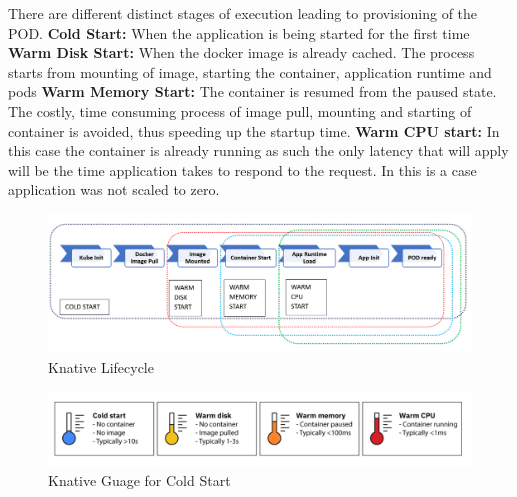 \documentclass{article}
\begin{document}
\begin{flushleft}
There are different distinct stages of execution leading to provisioning of the POD. 
\newline
\textbf{Cold Start:} When the application is being started for the first time
\newline
\textbf{Warm Disk Start:} When the docker image is already cached. The process starts from mounting of image, starting the container, application runtime and pods
\newline
\textbf{Warm Memory Start:} The container is resumed from the paused state. The costly, time consuming process of image pull, mounting and starting of container is avoided, thus speeding up the startup time.
\newline
\textbf{Warm CPU start:} In this case the container is already running as such the only latency that will apply will be the time application takes to respond to the request. In this is a case application was not scaled to zero.
\pagebreak
\begin{figure}[h]
    \centering
    \includegraphics[width=1.0\linewidth]{images/Knative_lifecycle.PNG}
    \caption{Knative Lifecycle}
    \label{fig:enter-label}
\end{figure}
\par
\begin{figure}[h]
    \centering
    \includegraphics[width=1.0\linewidth]{images/ColdStart-Knative-Image.PNG}
    \caption{Knative Guage for Cold Start}
    \label{fig:enter-label}
\end{figure}
\par
{}
\end{flushleft}
\pagebreak
\end{document}
